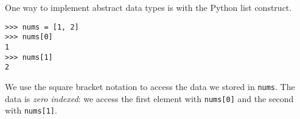 One way to implement abstract data types is with the Python list construct.

\begin{lstlisting}
>>> nums = [1, 2]
>>> nums[0]
1
>>> nums[1]
2
\end{lstlisting}

We use the square bracket notation to access the data we stored in
\texttt{nums}.  The data is \textit{zero indexed}: we access the first
element with {\tt nums[0]} and the second with {\tt nums[1]}.

